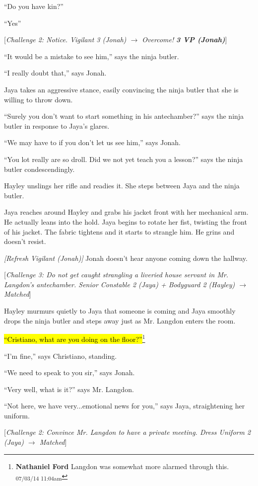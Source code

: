 ``Do you have kin?''

``Yes''

{[}\textit{Challenge 2: Notice. Vigilant 3 (Jonah) $\rightarrow$ Overcome! }\textit{\textbf{3 VP (Jonah)}}{]} 

``It would be a mistake to see him,'' says the ninja butler.

``I really doubt that,'' says Jonah.

Jaya takes an aggressive stance, easily convincing the ninja butler that she is willing to throw down.

``Surely you don't want to start something in his antechamber?'' says the ninja butler in response to Jaya's glares.

``We may have to if you don't let us see him,'' says Jonah.

``You lot really are so droll.  Did we not yet teach you a lesson?'' says the ninja butler condescendingly.

Hayley unslings her rifle and readies it.  She steps between Jaya and the ninja butler.

Jaya reaches around Hayley and grabs his jacket front with her mechanical arm.  He actually leans into the hold.  Jaya begins to rotate her fist, twisting the front of his jacket.  The fabric tightens and it starts to strangle him.  He grins and doesn't resist.

\textit{{[}Refresh Vigilant (Jonah){]}}  Jonah doesn't hear anyone coming down the hallway.

{[}\textit{Challenge 3: Do not get caught strangling a liveried house servant in Mr. Langdon's antechamber. Senior Constable 2 (Jaya) + Bodyguard 2 (Hayley) $\rightarrow$ Matched}{]} 

Hayley murmurs quietly to Jaya that someone is coming and Jaya smoothly drops the ninja butler and steps away just as Mr. Langdon enters the room.

\hl{``Cristiano, what are you doing on the floor?''}\footnote{\textbf{Nathaniel Ford }Langdon was somewhat more alarmed through this. \textsubscript{07/03/14 11:04am}}

``I'm fine,'' says Christiano, standing.

``We need to speak to you sir,'' says Jonah.

``Very well, what is it?'' says Mr. Langdon.

``Not here, we have very...emotional news for you,'' says Jaya, straightening her uniform.

{[}\textit{Challenge 2: Convince Mr. Langdon to have a private meeting. Dress Uniform 2 (Jaya) $\rightarrow$ Matched}{]} 

